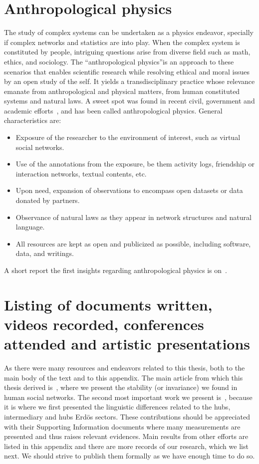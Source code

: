 \begin{apendicesenv}
\section{Anthropological physics}
The study of complex systems can be undertaken as a physics endeavor,
specially if complex networks and statistics are into play. When the complex
system is constituted by people, intriguing questions arise from diverse field such as math, ethics, and sociology. The “anthropological physics”is an approach to these scenarios that enables scientific research while resolving ethical and moral issues by an open study of the self.
	It yields a transdisciplinary practice whose relevance emanate from anthropological
and physical matters, from human constituted systems and natural laws.
A sweet spot was found in recent civil, government and academic efforts~\cite{opa,ensaio}, and has been called anthropological physics. General characteristics are:
\begin{itemize}
	\item Exposure of the researcher to the environment of interest, such as virtual social networks.
	\item Use of the annotations from the exposure, be them activity logs, friendship or interaction networks, textual contents, etc.
	\item Upon need, expansion of observations to encompass open datasets or data donated by partners.
	\item Observance of natural laws as they appear in network structures and natural language.
	\item All resources are kept as open and publicized as possible, including software, data, and writings.
\end{itemize}                                                                                                                                     
A short report the first insights regarding anthropological physics is on~\cite{anPhy}.
 
\section{Listing of documents written, videos recorded, conferences attended and artistic presentations}
As there were many resources and endeavors related to this thesis,
both to the main body of the text and to this appendix.
The main article from which this thesis derived is~\cite{stab},
where we present the stability (or invariance) we found in human social networks.
The second most important work we present is~\cite{rcText}, because it is where we
first presented the linguistic differences related to the hubs, intermediary and hubs
Erd\"os sectors.
These contributions should be appreciated with their Supporting Information documents
where many measurements are presented and thus raises relevant evidences.
Main results from other efforts are listed in this appendix and there
are more records of our research, which we list next.
We should strive to publish them formally as we have enough time to do so.


\end{apendicesenv}
